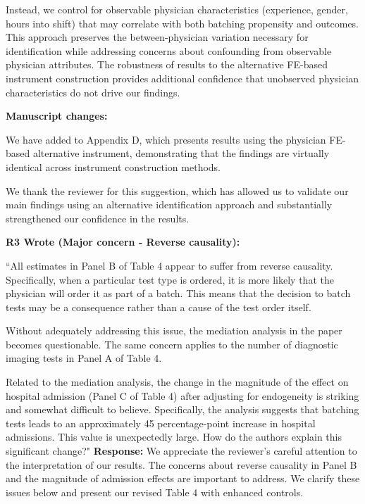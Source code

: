 \documentclass[11pt]{article}
\newenvironment{quote2}
{ \bigskip
\noindent
         \small\em
         \baselineskip=14pt
}
\newcommand{\1}{\hbox{\rm 1\kern-.35em 1}}
\begin{document}
Instead, we control for observable physician characteristics (experience, gender, hours into shift) that may correlate with both batching propensity and outcomes. This approach preserves the between-physician variation necessary for identification while addressing concerns about confounding from observable physician attributes. The robustness of results to the alternative FE-based instrument construction provides additional confidence that unobserved physician characteristics do not drive our findings.

\textbf{Manuscript changes:}

We have added to Appendix D, which presents results using the physician FE-based alternative instrument, demonstrating that the findings are virtually identical across instrument construction methods.

We thank the reviewer for this suggestion, which has allowed us to validate our main findings using an alternative identification approach and substantially strengthened our confidence in the results.
\color{black}

\begin{quote2}
\textbf{R3 Wrote (Major concern -  Reverse causality):}  

\noindent ``All estimates in Panel B of Table 4 appear to suffer from reverse causality. Specifically, when a particular test type is ordered, it is more likely that the physician will order it as part of a batch. This means that the decision to batch tests may be a consequence rather than a cause of the test order itself.

Without adequately addressing this issue, the mediation analysis in the paper becomes questionable. The same concern applies to the number of diagnostic imaging tests in Panel A of Table 4.

Related to the mediation analysis, the change in the magnitude of the effect on hospital admission (Panel C of Table 4) after adjusting for endogeneity is striking and somewhat difficult to believe. Specifically, the analysis suggests that batching tests leads to an approximately 45 percentage-point increase in hospital admissions. This value is unexpectedly large. How do the authors explain this significant change?"
\end{quote2}
\noindent\textbf{Response:} \color{blue}We appreciate the reviewer's careful attention to the interpretation of our results. The concerns about reverse causality in Panel B and the magnitude of admission effects are important to address. We clarify these issues below and present our revised Table 4 with enhanced controls.
\end{document}
